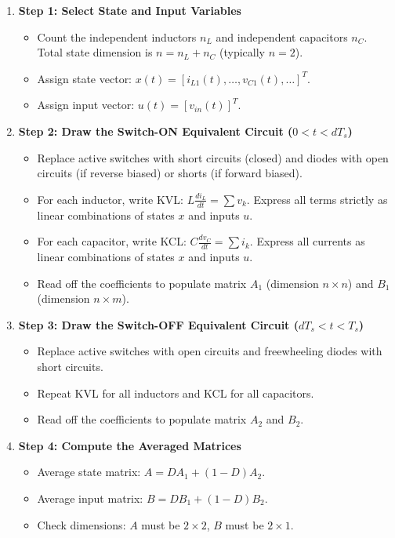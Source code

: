 \begin{enumerate}
  \item \textbf{Step 1: Select State and Input Variables}
  \begin{itemize}
    \item Count the independent inductors $n_L$ and independent capacitors $n_C$. Total state dimension is $n = n_L + n_C$ (typically $n=2$).
    \item Assign state vector: $x(t) = [i_{L1}(t), \dots, v_{C1}(t), \dots]^T$.
    \item Assign input vector: $u(t) = [v_{in}(t)]^T$.
  \end{itemize}

  \item \textbf{Step 2: Draw the Switch-ON Equivalent Circuit ($0 < t < d T_s$)}
  \begin{itemize}
    \item Replace active switches with short circuits (closed) and diodes with open circuits (if reverse biased) or shorts (if forward biased).
    \item For each inductor, write KVL: $L \frac{di_L}{dt} = \sum v_k$. Express all terms strictly as linear combinations of states $x$ and inputs $u$.
    \item For each capacitor, write KCL: $C \frac{dv_C}{dt} = \sum i_k$. Express all currents as linear combinations of states $x$ and inputs $u$.
    \item Read off the coefficients to populate matrix $A_1$ (dimension $n\times n$) and $B_1$ (dimension $n\times m$).
  \end{itemize}

  \item \textbf{Step 3: Draw the Switch-OFF Equivalent Circuit ($d T_s < t < T_s$)}
  \begin{itemize}
    \item Replace active switches with open circuits and freewheeling diodes with short circuits.
    \item Repeat KVL for all inductors and KCL for all capacitors.
    \item Read off the coefficients to populate matrix $A_2$ and $B_2$.
  \end{itemize}

  \item \textbf{Step 4: Compute the Averaged Matrices}
  \begin{itemize}
    \item Average state matrix: $A = D A_1 + (1-D) A_2$.
    \item Average input matrix: $B = D B_1 + (1-D) B_2$.
    \item Check dimensions: $A$ must be $2\times 2$, $B$ must be $2\times 1$.
  \end{itemize}


\end{enumerate}
